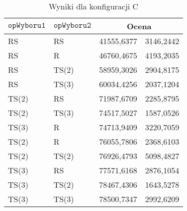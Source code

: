 \documentclass[twoside]{iisthesis}
\newcommand{\param}[1]{\mathtt{#1}}
\begin{document}
\begin{table}[h]
	\caption{Wyniki dla konfiguracji C \label{table:tsp_results_compare_c}}
	\centering
	\begin{tabular}{|l|l|r@{$\pm$}l|}
		\hline
		\multicolumn{1}{|c|}{{\bf $\param{opWyboru1}$}} & \multicolumn{1}{c|}{{\bf $\param{opWyboru2}$}} & \multicolumn{2}{c|}{{\bf Ocena}} \\ \hline \hline
			RS & RS & 41555,6377 & 3146,2442 \\ \hline
			RS & R & 46760,4675 & 4193,2035 \\ \hline
			RS & TS(2) & 58959,3026 & 2904,8175 \\ \hline
			RS & TS(3) & 60034,4256 & 2037,1204 \\ \hline
			TS(2) & RS & 71987,6709 & 2285,8795 \\ \hline
			TS(2) & TS(3) & 74517,5027 & 1587,0526 \\ \hline
			TS(3) & R & 74713,9409 & 3220,7059 \\ \hline
			TS(2) & R & 76055,7806 & 2368,6103 \\ \hline
			TS(2) & TS(2) & 76926,4793 & 5098,4827 \\ \hline
			TS(3) & RS & 77571,6168 & 2876,1054 \\ \hline
			TS(3) & TS(2) & 78467,4306 & 1643,5278 \\ \hline
			TS(3) & TS(3) & 78500,7347 & 2992,6209 \\ \hline
	\end{tabular}
\end{table}
\end{document}
